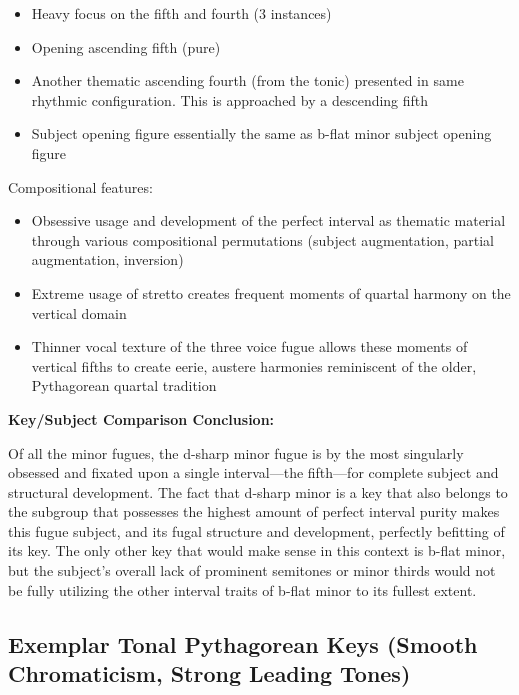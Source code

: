 \begin{itemize}
\tightlist
\item
  Heavy focus on the fifth and fourth (3 instances)
\item
  Opening ascending fifth (pure)
\item
  Another thematic ascending fourth (from the tonic) presented in same
  rhythmic configuration. This is approached by a descending fifth
\item
  Subject opening figure essentially the same as b-flat minor subject
  opening figure
\end{itemize}

Compositional features:

\begin{itemize}
\tightlist
\item
  Obsessive usage and development of the perfect interval as thematic
  material through various compositional permutations (subject
  augmentation, partial augmentation, inversion)
\item
  Extreme usage of stretto creates frequent moments of quartal harmony
  on the vertical domain
\item
  Thinner vocal texture of the three voice fugue allows these moments of
  vertical fifths to create eerie, austere harmonies reminiscent of the
  older, Pythagorean quartal tradition
\end{itemize}

\textbf{Key/Subject Comparison Conclusion:}

Of all the minor fugues, the d-sharp minor fugue is by the most
singularly obsessed and fixated upon a single interval---the
fifth---for complete subject and structural development. The fact
that d-sharp minor is a key that also belongs to the subgroup that
possesses the highest amount of perfect interval purity makes this fugue
subject, and its fugal structure and development, perfectly befitting of
its key. The only other key that would make sense in this context is
b-flat minor, but the subject's overall lack of prominent semitones or
minor thirds would not be fully utilizing the other interval traits of
b-flat minor to its fullest extent.

    \subsection{Exemplar Tonal Pythagorean Keys (Smooth Chromaticism, Strong
Leading
Tones)}\label{exemplar-tonal-pythagorean-keys-smooth-chromaticism-strong-leading-tones}

